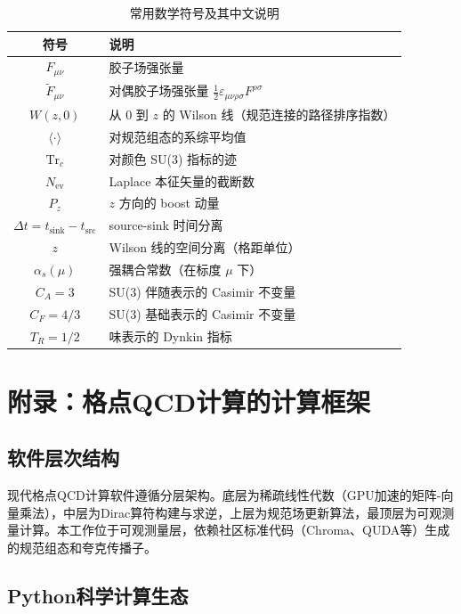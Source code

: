 \documentclass[11pt,a4paper]{ctexart}
\newcommand{\Fmunu}{F_{\mu\nu}}
\newcommand{\Ftmunu}{\tilde{F}_{\mu\nu}}
\newcommand{\eps}{\varepsilon}
\newcommand{\tr}{\operatorname{Tr}}
\newcommand{\vev}[1]{\langle #1 \rangle}
\begin{document}
\begin{table}[htbp]
\centering
\caption{常用数学符号及其中文说明}
\begin{tabular}{c l}
\toprule
\textbf{符号} & \textbf{说明} \\
\midrule
$\Fmunu$ & 胶子场强张量 \\
$\Ftmunu$ & 对偶胶子场强张量 $\frac{1}{2}\eps_{\mu\nu\rho\sigma}F^{\rho\sigma}$ \\
$W(z,0)$ & 从 $0$ 到 $z$ 的 Wilson 线（规范连接的路径排序指数） \\
$\vev{\cdot}$ & 对规范组态的系综平均值 \\
$\tr_c$ & 对颜色 SU(3) 指标的迹 \\
$N_{\text{ev}}$ & Laplace 本征矢量的截断数 \\
$P_z$ & $z$ 方向的 boost 动量 \\
$\Delta t = t_{\text{sink}} - t_{\text{src}}$ & source-sink 时间分离 \\
$z$ & Wilson 线的空间分离（格距单位） \\
$\alpha_s(\mu)$ & 强耦合常数（在标度 $\mu$ 下） \\
$C_A = 3$ & SU(3) 伴随表示的 Casimir 不变量 \\
$C_F = 4/3$ & SU(3) 基础表示的 Casimir 不变量 \\
$T_R = 1/2$ & 味表示的 Dynkin 指标 \\
\bottomrule
\end{tabular}
\end{table}


\section{附录：格点QCD计算的计算框架}

\subsection{软件层次结构}

现代格点QCD计算软件遵循分层架构。底层为稀疏线性代数（GPU加速的矩阵-向量乘法），中层为Dirac算符构建与求逆，上层为规范场更新算法，最顶层为可观测量计算。本工作位于可观测量层，依赖社区标准代码（Chroma、QUDA等）生成的规范组态和夸克传播子。

\subsection{Python科学计算生态}
\end{document}
